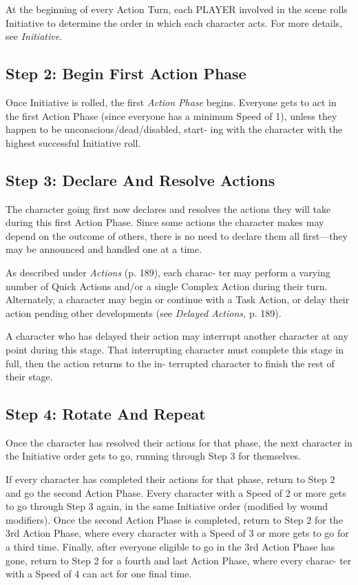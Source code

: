 At the beginning of every Action Turn, each PLAYER 
involved in the scene rolls Initiative to determine the 
order in which each character acts. For more details, 
see \textit{Initiative.}

\subsection{Step 2: Begin First Action Phase}

Once Initiative is rolled, the first  \textit{Action Phase}
begins. Everyone gets to act in the first Action Phase 
(since everyone has a minimum Speed of 1), unless 
they happen to be unconscious/dead/disabled, start-
ing with the character with the highest successful 
Initiative roll.

\subsection{Step 3: Declare And Resolve Actions}

The character going first now declares and resolves 
the actions they will take during this first Action 
Phase. Since some actions the character makes may 
depend on the outcome of others, there is no need 
to declare them all first—they may be announced 
and handled one at a time.

As described under \textit{Actions} (p. 189), each charac-
ter may perform a varying number of Quick Actions 
and/or a single Complex Action during their turn. 
Alternately, a character may begin or continue with 
a Task Action, or delay their action pending other 
developments (see \textit{Delayed Actions,} p. 189).

A character who has delayed their action may 
interrupt another character at any point during this 
stage. That interrupting character must complete 
this stage in full, then the action returns to the in-
terrupted character to finish the rest of their stage.

\subsection{Step 4: Rotate And Repeat}

Once the character has resolved their actions for 
that phase, the next character in the Initiative order 
gets to go, running through Step 3 for themselves.

If every character has completed their actions 
for that phase, return to Step 2 and go the second 
Action Phase. Every character with a Speed of 2 or 
more gets to go through Step 3 again, in the same 
Initiative order (modified by wound modifiers). 
Once the second Action Phase is completed, return 
to Step 2 for the 3rd Action Phase, where every 
character with a Speed of 3 or more gets to go for 
a third time. Finally, after everyone eligible to go in 
the 3rd Action Phase has gone, return to Step 2 for 
a fourth and last Action Phase, where every charac-
ter with a Speed of 4 can act for one final time.

